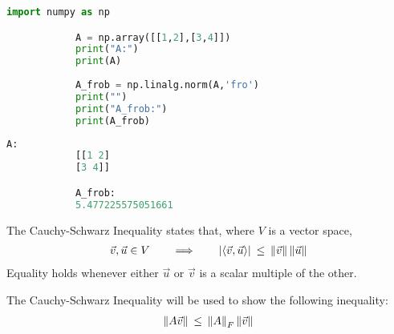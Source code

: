 \begin{example}
    \begin{tcolorbox}[sharp corners, colback=black!5!white, colframe=black!75!black, fontupper=\color{black}]
        \begin{lstlisting}[language=python, gobble = 12]
            import numpy as np

            A = np.array([[1,2],[3,4]])
            print("A:")
            print(A)
            
            A_frob = np.linalg.norm(A,'fro')
            print("")
            print("A_frob:")
            print(A_frob)
        \end{lstlisting}
    \end{tcolorbox}

    \begin{tcolorbox}[sharp corners, colback=green!10!white, colframe=black!75!black, fontupper=\color{black}]
        \begin{lstlisting}[language=python, gobble = 12]
            A:
            [[1 2]
            [3 4]]

            A_frob:
            5.477225575051661
        \end{lstlisting}
    \end{tcolorbox}
\end{example}

\begin{tcolorbox}[sharp corners, colback=yellow!5!white, colframe=black!75!black, fontupper=\color{black}]
\begin{theorem}
    The Cauchy-Schwarz Inequality states that, where $V$ is a vector space, 
    \begin{align*}
        \vec{v}, \vec{u} \in V \hspace{20pt} \Longrightarrow \hspace{20pt} \lvert \langle \vec{v} , \vec{u} \rangle \rvert \hspace{2pt} \leq \hspace{2pt} \left\lVert\vec{v}\right\rVert \left\lVert\vec{u}\right\rVert
    \end{align*}
    Equality holds whenever either $\vec{u}$ or $\vec{v}$ is a scalar multiple of the other.
\end{theorem}
\end{tcolorbox}

The Cauchy-Schwarz Inequality will be used to show the following inequality:
\begin{align*}
    \left\lVert A\vec{v}\right\rVert \hspace{2pt} \leq \hspace{2pt} \left\lVert A\right\rVert_{F} \left\lVert\vec{v}\right\rVert
\end{align*}

